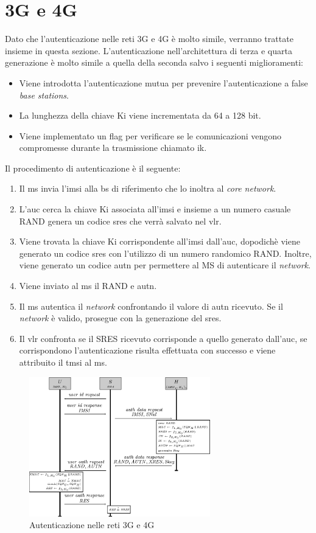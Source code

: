 \section{3G e 4G}
Dato che l'autenticazione nelle reti 3G e 4G è molto simile, verranno trattate insieme in questa sezione.
L'autenticazione nell'architettura di terza e quarta generazione è molto simile a quella della seconda salvo i seguenti miglioramenti:
\begin{itemize}
    \item Viene introdotta l'autenticazione mutua per prevenire l'autenticazione a false \textit{base stations}.
    \item La lunghezza della chiave Ki viene incrementata da 64 a 128 bit.
    \item Viene implementato un flag per verificare se le comunicazioni vengono compromesse durante la trasmissione chiamato \gls{ik}.
\end{itemize}
Il procedimento di autenticazione è il seguente\cite{4g-auth}:
\begin{enumerate}
    \item Il \gls{ms} invia l'\gls{imsi} alla \gls{bs} di riferimento che lo inoltra al \textit{core network}.
    \item L'\gls{auc} cerca la chiave Ki associata all'\gls{imsi} e insieme a un numero casuale RAND genera un codice \gls{sres} che verrà
    salvato nel \gls{vlr}.
    \item Viene trovata la chiave Ki corrispondente all'\gls{imsi} dall'\gls{auc}, dopodichè viene generato un codice \gls{sres} con l'utilizzo di un numero randomico RAND.
    Inoltre, viene generato un codice \gls{autn} per permettere al MS di autenticare il \textit{network}.
    \item Viene inviato al \gls{ms} il RAND e \gls{autn}.
    \item Il \gls{ms} autentica il \textit{network} confrontando il valore di \gls{autn} ricevuto. Se il \textit{network} è valido, prosegue con la generazione del \gls{sres}.
    \item Il \gls{vlr} confronta se il SRES ricevuto corrisponde a quello generato dall'\gls{auc}, se corrispondono l'autenticazione risulta
    effettuata con successo e viene attribuito il \gls{tmsi} al \gls{ms}.
\end{enumerate}
\begin{figure}[h]
    \centering
    \includegraphics[width=0.7\textwidth]{images/auth-3g.png}
    \caption{Autenticazione nelle reti 3G e 4G}
\end{figure}

